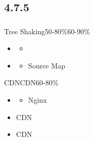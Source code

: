 \important{}\important{}

\important{}

\important{}

\important{}

\important{}

\hypertarget{section-85}{%
\paragraph{}\label{section-85}}

\important{}

\important{}

\important{}

\important{}

\important{}

\hypertarget{section-86}{%
\subsection{4.7.5}\label{section-86}}

\hypertarget{section-87}{%
\subsubsection{}\label{section-87}}


Tree Shaking50-80\%60-90\%

\begin{itemize}
\item
  \begin{itemize}
  \tightlist
  \item
  \end{itemize}
\item
  \begin{itemize}
  \tightlist
  \item
    Source Map
  \end{itemize}
\end{itemize}


CDNCDN60-80\%

\begin{itemize}
\item
  \begin{itemize}
  \tightlist
  \item
    Nginx
  \end{itemize}
\item
  CDN
\item
  CDN
\end{itemize}

